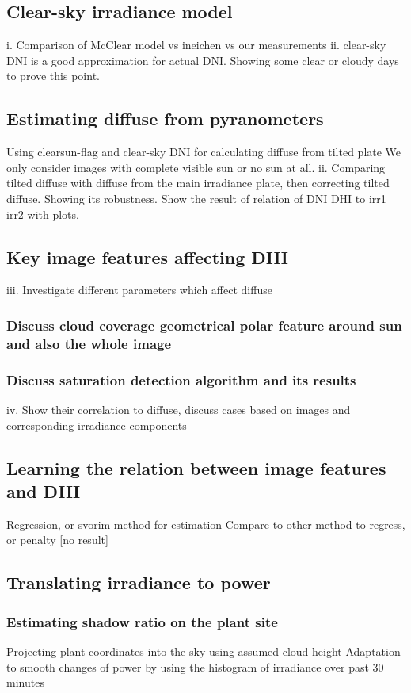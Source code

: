 \subsection{Clear-sky irradiance model}
i.	Comparison of McClear model vs ineichen vs our measurements
ii.	clear-sky DNI is a good approximation for actual DNI. Showing some clear or cloudy days to prove this point.


\subsection{Estimating diffuse from pyranometers}
Using clearsun-flag and clear-sky DNI for calculating diffuse from tilted plate
We only consider images with complete visible sun or no sun at all.
ii.	Comparing tilted diffuse with diffuse from the main irradiance plate, then correcting tilted diffuse. Showing its robustness.
Show the result of relation of DNI DHI to irr1 irr2 with plots.

\subsection{Key image features affecting DHI}
iii.	Investigate different parameters which affect diffuse
\subsubsection{Discuss cloud coverage geometrical polar feature around sun and also the whole image}
\subsubsection{Discuss saturation detection algorithm and its results}

iv.	Show their correlation to diffuse, discuss cases based on images and corresponding irradiance components


\subsection{Learning the relation between image features and DHI}
Regression, or svorim method for estimation
Compare to other method to regress, or penalty [no result]



\subsection{Translating irradiance to power}
\subsubsection{Estimating shadow ratio on the plant site}
Projecting plant coordinates into the sky using assumed cloud height
Adaptation to smooth changes of power by using the histogram of irradiance over past 30 minutes

